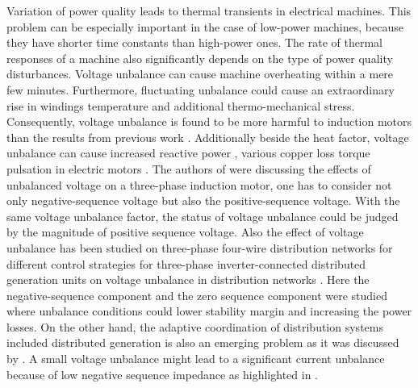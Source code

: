  \cite{paz2010system} Variation of power quality   leads to thermal transients in electrical machines. This problem can be especially important in the case of low-power machines, because they have shorter time constants than high-power ones. The rate of thermal responses of a machine also significantly depends on the type of power quality disturbances. Voltage unbalance can cause  machine  overheating  within  a  mere  few  minutes. Furthermore,  fluctuating  unbalance  could  cause  an  extraordinary rise  in  windings  temperature  and  additional  thermo-mechanical stress.  Consequently,  voltage  unbalance  is  found  to  be  more harmful to induction motors than the results from previous work \cite{gnacinski2019induction}. Additionally beside the heat factor, voltage unbalance can cause increased reactive power \cite{savaghebi2012secondary}, various copper loss \cite{siddique2004effects} torque pulsation in electric motors \cite{brekken2005control}. The authors of \cite{lee1998effects} were discussing the effects of unbalanced voltage on a three-phase induction motor, one has to consider not only negative-sequence voltage but also the positive-sequence voltage. With the same voltage unbalance factor, the status of voltage unbalance could be judged by the magnitude of positive sequence voltage. Also the effect of voltage unbalance has been studied on three-phase four-wire distribution networks for different control strategies for three-phase inverter-connected distributed generation units on voltage unbalance in distribution networks \cite{meersman2011three}. Here the negative-sequence component and the zero sequence component were studied where unbalance conditions could lower stability margin and increasing the power losses. On the other hand, the adaptive coordination of distribution systems included distributed generation is also an emerging problem as it was discussed by \cite{ates2016}.  A small voltage unbalance might lead to a significant current unbalance because of low negative sequence impedance as highlighted in \cite{bina2011three}.\\
